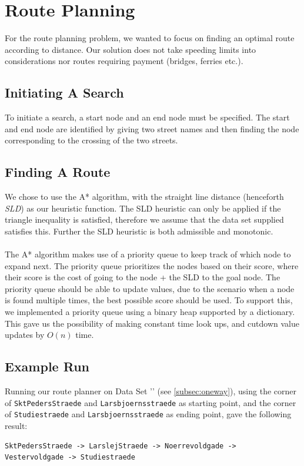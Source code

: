 \documentclass[11pt]{article}
\begin{document}
\section{Route Planning}
For the route planning problem, we wanted to focus on finding an optimal route according to distance. Our solution does not take speeding limits into considerations nor routes requiring payment (bridges, ferries etc.).

\subsection{Initiating A Search}
To initiate a search, a start node and an end node must be specified. The start and end node are identified by giving two street names and then finding the node corresponding to the crossing of the two streets.

\subsection{Finding A Route}
We chose to use the A* algorithm, with the straight line distance (henceforth \emph{SLD}) as our heuristic function. The SLD heuristic can only be applied if the triangle inequality is satisfied, therefore we assume that the data set supplied satisfies this. Further the SLD heuristic is both admissible and monotonic.\\
\\
The A* algorithm makes use of a priority queue to keep track of which node to expand next. The priority queue prioritizes the nodes based on their score, where their score is the cost of going to the node + the SLD to the goal node. The priority queue should be able to update values, due to the scenario when a node is found multiple times, the best possible score should be used. To support this, we implemented a priority queue using a binary heap supported by a dictionary. This gave us the possibility of making constant time look ups, and cutdown value updates by $O(n)$ time.

\subsection{Example Run}
Running our route planner on Data Set '' (see \ref{subsec:oneway}), using the corner of {\tt SktPedersStraede} and {\tt Larsbjoernsstraede} as starting point, and the corner of {\tt Studiestraede} and {\tt Larsbjoernsstraede} as ending point, gave the following result:
\begin{lstlisting}[style=logoutput]
SktPedersStraede -> LarslejStraede -> Noerrevoldgade ->
Vestervoldgade -> Studiestraede
\end{lstlisting}
\end{document}
